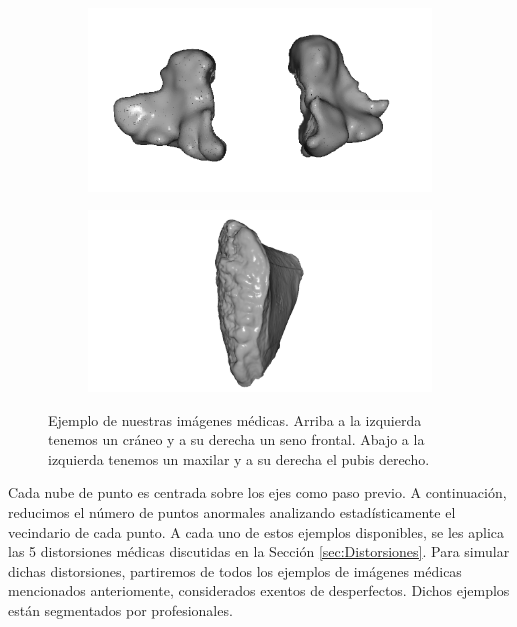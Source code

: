 \begin{figure}[htp]
  \begin{subfigure}[b]{0.40\textwidth}
  \centering 
  \includegraphics[width=\textwidth]{imagenes/chapter4/Maxilar100205.png}
  \end{subfigure}
  \begin{subfigure}[b]{0.40\textwidth}
  \centering 
  \includegraphics[width=\textwidth]{imagenes/chapter4/PubisDch.png}
  \end{subfigure}
  \caption[Ejemplo de nuestras imágenes médicas.]{Ejemplo de nuestras imágenes médicas.
  Arriba a la izquierda tenemos un cráneo y a su derecha un seno frontal. 
  Abajo a la izquierda tenemos un maxilar y a su derecha el pubis derecho.}
  \label{fig:OurDataExample}
\end{figure}


Cada nube de punto es centrada sobre los ejes como paso previo. A continuación, 
reducimos el número de puntos anormales analizando estadísticamente el vecindario de cada punto. 
A cada uno de estos ejemplos disponibles, se les aplica las 5 distorsiones médicas
discutidas en la Sección \ref{sec:Distorsiones}. 
Para simular dichas distorsiones, partiremos de todos los ejemplos de imágenes médicas 
mencionados anteriomente, considerados exentos de desperfectos. Dichos ejemplos 
están segmentados por profesionales. 


